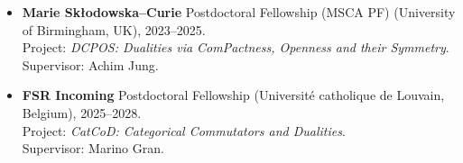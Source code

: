{\begin{minipage}[t]{0.48\textwidth}
\vspace{1em}



\begin{itemize}
  \setlength\itemsep{0.25em}
  \setlength\parskip{0pt}
  \setlength\parsep{0pt}
  \item \textbf{Marie Sk{\l}odowska--Curie} Postdoctoral Fellowship (MSCA PF) (University of Birmingham, UK), 2023--2025.\\
        Project: \emph{DCPOS: Dualities via ComPactness, Openness and their Symmetry}.\\
        Supervisor: Achim Jung.
  \item \textbf{FSR Incoming} Postdoctoral Fellowship (Université catholique de Louvain, Belgium), 2025--2028.\\
        Project: \emph{CatCoD: Categorical Commutators and Dualities}.\\
        Supervisor: Marino Gran.
\end{itemize}


\end{minipage}
\hfill
\begin{minipage}[t]{0.48\textwidth}





\end{minipage}}
